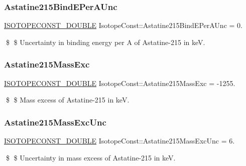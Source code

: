 \subsubsection{\texorpdfstring{Astatine215\+Bind\+E\+Per\+A\+Unc}{Astatine215BindEPerAUnc}}
{\footnotesize\ttfamily \mbox{\hyperlink{group___isotope_const-_macros_ga8f45a7272ce02c0b4c65c44636ed719a}{I\+S\+O\+T\+O\+P\+E\+C\+O\+N\+S\+T\+\_\+\+D\+O\+U\+B\+LE}} Isotope\+Const\+::\+Astatine215\+Bind\+E\+Per\+A\+Unc = 0.}

\$ \$ Uncertainty in binding energy per A of Astatine-\/215 in keV. \mbox{\label{group___isotope_const-_astatine-_at215_ga691fb3514d144668b0a7dd0eaf0f417d}} 
\subsubsection{\texorpdfstring{Astatine215\+Mass\+Exc}{Astatine215MassExc}}
{\footnotesize\ttfamily \mbox{\hyperlink{group___isotope_const-_macros_ga8f45a7272ce02c0b4c65c44636ed719a}{I\+S\+O\+T\+O\+P\+E\+C\+O\+N\+S\+T\+\_\+\+D\+O\+U\+B\+LE}} Isotope\+Const\+::\+Astatine215\+Mass\+Exc = -\/1255.}

\$ \$ Mass excess of Astatine-\/215 in keV. \mbox{\label{group___isotope_const-_astatine-_at215_gaba58354973f852052b9f3fd03434ff0c}} 
\subsubsection{\texorpdfstring{Astatine215\+Mass\+Exc\+Unc}{Astatine215MassExcUnc}}
{\footnotesize\ttfamily \mbox{\hyperlink{group___isotope_const-_macros_ga8f45a7272ce02c0b4c65c44636ed719a}{I\+S\+O\+T\+O\+P\+E\+C\+O\+N\+S\+T\+\_\+\+D\+O\+U\+B\+LE}} Isotope\+Const\+::\+Astatine215\+Mass\+Exc\+Unc = 6.}

\$ \$ Uncertainty in mass excess of Astatine-\/215 in keV. \mbox{\label{group___isotope_const-_astatine-_at215_ga86aa55632de4771adaede7058b5f6191}} 
